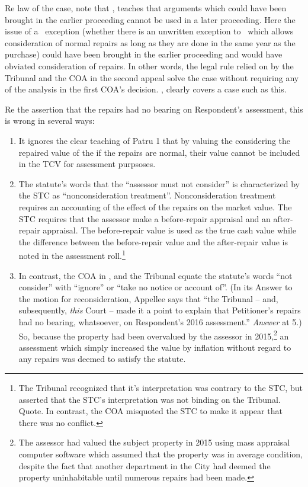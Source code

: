 \documentclass[12pt,\documentclassflag]{michiganCourtOfAppealsBrief}
\begin{document}
\begin{todolist}
  Re law of the case, note that \cite{Bennett}, teaches that arguments which could have been brought in the earlier proceeding cannot be used in a later proceeding. Here the issue of a \mathieuGast\ exception (whether there is an unwritten exception to \mathieuGast\ which allows consideration of normal repairs as long as they are done in the same year as the purchase) could have been brought in the earlier proceeding and would have obviated consideration of repairs. In other words, the legal rule relied on by the Tribunal and the COA in the second appeal solve the case without requiring any of the analysis in the first COA's decision. \cite{Bennett}, clearly covers a case such as this.

  Re the assertion that the repairs had no bearing on Respondent's assessment, this is wrong in several ways:
  \begin{enumerate}
    \item It ignores the clear teaching of Patru 1 that by valuing the considering the repaired value of the  if the repairs are normal, their value cannot be included in the TCV for assessment purpsoses.

    \item The statute's words that the ``assessor must not consider'' is characterized by the STC as ``nonconsideration treatment''. Nonconsideration treatment requires an accounting of the effect of the repairs on the market value. The STC requires that the assessor make a before-repair appraisal and an after-repair appraisal. The before-repair value is used as the true cash value while the difference between the before-repair value and the after-repair value is noted in the assessment roll.\footnote{The Tribunal recognized that it's interpretation was contrary to the STC, but asserted that the STC's interpretation was not binding on the Tribunal. Quote. In contrast, the  COA misquoted the STC to make it appear that there was no conflict.}

    \item In contrast, the COA in \cite{Patru 2}, and the Tribunal equate the statute's words ``not consider'' with ``ignore'' or ``take no notice or account of''. (In its Answer to the motion for reconsideration, Appellee says that ``the Tribunal -- and, subsequently, \emph{this} Court -- made it a point to explain that Petitioner's repairs had no bearing, whatsoever, on Respondent's 2016 assessment.'' \emph{Answer} at 5.)  So, because the property had been overvalued by the assessor in 2015,\footnote{The assessor had valued the subject property in 2015 using mass appraisal computer software which assumed that the property was in average condition, despite the fact that another department in the City had deemed the property uninhabitable until numerous repairs had been made.} an assessment which simply increased the value by inflation without regard to any repairs was deemed to satisfy the statute. 


\end{enumerate}
\end{todolist}
\end{document}
